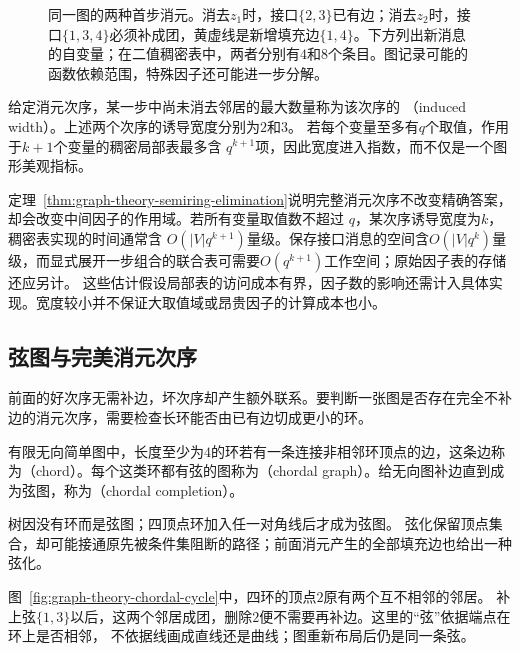 \begin{figure}[htbp]
  \centering
  
  \caption{同一图的两种首步消元。消去\(z_1\)时，接口\(\{2,3\}\)已有边；消去\(z_2\)时，接口\(\{1,3,4\}\)必须补成团，黄虚线是新增填充边\(\{1,4\}\)。下方列出新消息的自变量；在二值稠密表中，两者分别有\(4\)和\(8\)个条目。图记录可能的函数依赖范围，特殊因子还可能进一步分解。}
  \label{fig:graph-theory-elimination-fill}
\end{figure}

给定消元次序，某一步中尚未消去邻居的最大数量称为该次序的
（induced width）。上述两个次序的诱导宽度分别为\(2\)和\(3\)。
若每个变量至多有\(q\)个取值，作用于\(k+1\)个变量的稠密局部表最多含
\(q^{k+1}\)项，因此宽度进入指数，而不仅是一个图形美观指标。

定理~\ref{thm:graph-theory-semiring-elimination}说明完整消元次序不改变精确答案，却会改变中间因子的作用域。若所有变量取值数不超过
\(q\)，某次序诱导宽度为\(k\)，稠密表实现的时间通常含
\(O(|V|q^{k+1})\)量级。保存接口消息的空间含\(O(|V|q^k)\)量级，而显式展开一步组合的联合表可需要\(O(q^{k+1})\)工作空间；原始因子表的存储还应另计。
这些估计假设局部表的访问成本有界，因子数的影响还需计入具体实现。宽度较小并不保证大取值域或昂贵因子的计算成本也小。

\subsection{弦图与完美消元次序}
\label{sec:graph-theory-chordal-elimination}

前面的好次序无需补边，坏次序却产生额外联系。要判断一张图是否存在完全不补边的消元次序，需要检查长环能否由已有边切成更小的环。

\begin{definition}[弦与弦图]
\label{def:graph-theory-chordal-graph}
有限无向简单图中，长度至少为\(4\)的环若有一条连接非相邻环顶点的边，这条边称为（chord）。每个这类环都有弦的图称为（chordal graph）。给无向图补边直到成为弦图，称为（chordal completion）。
\end{definition}

树因没有环而是弦图；四顶点环加入任一对角线后才成为弦图。
弦化保留顶点集合，却可能接通原先被条件集阻断的路径；前面消元产生的全部填充边也给出一种弦化。

图~\ref{fig:graph-theory-chordal-cycle}中，四环的顶点\(2\)原有两个互不相邻的邻居。
补上弦\(\{1,3\}\)以后，这两个邻居成团，删除\(2\)便不需要再补边。这里的“弦”依据端点在环上是否相邻，
不依据线画成直线还是曲线；图重新布局后仍是同一条弦。

